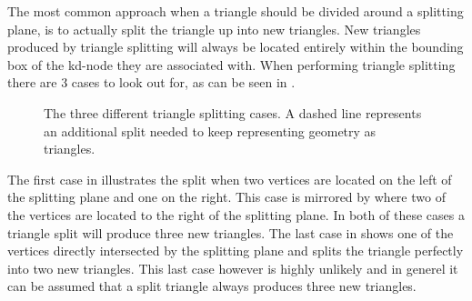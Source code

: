 
The most common approach when a triangle should be divided around a
splitting plane, is to actually split the triangle up into new
triangles. New triangles produced by triangle splitting will always be
located entirely within the bounding box of the kd-node they are
associated with. When performing triangle splitting there are 3 cases
to look out for, as can be seen in .

\begin{figure}
  \centering
  \hspace{5mm}
  \hspace{5mm}

  \vspace{3mm}
  \parbox{10cm}{\caption[The three different triangle splitting
      cases.]{The three different triangle splitting cases. A dashed
      line represents an additional split needed to keep representing
      geometry as triangles.}\label{fig:splittingCases}}
\end{figure}

The first case in  illustrates the split when two
vertices are located on the left of the splitting plane and one on the
right. This case is mirrored by  where two of the
vertices are located to the right of the splitting plane. In both of these cases
a triangle split will produce three new triangles. The last case in
 shows one of the vertices directly intersected by
the splitting plane and splits the triangle perfectly into two new
triangles. This last case however is highly unlikely and in generel it can be
assumed that a split triangle always produces three new triangles.


